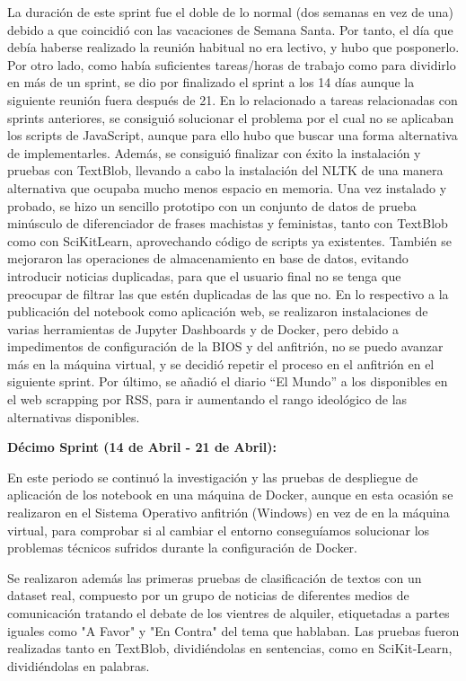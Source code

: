 La duración de este sprint fue el doble de lo normal (dos semanas en vez de una) debido a que coincidió con las vacaciones de Semana Santa. Por tanto, el día que debía haberse realizado la reunión habitual no era lectivo, y hubo que posponerlo. 
Por otro lado, como había suficientes tareas/horas de trabajo como para dividirlo en más de un sprint, se dio por finalizado el sprint a los 14 días aunque la siguiente reunión fuera después de 21.
En lo relacionado a tareas relacionadas con sprints anteriores, se consiguió solucionar el problema por el cual no se aplicaban los scripts de JavaScript, aunque para ello hubo que buscar una forma alternativa de implementarles.
Además, se consiguió finalizar con éxito la instalación y pruebas con TextBlob, llevando a cabo la instalación del NLTK de una manera alternativa que ocupaba mucho menos espacio en memoria. Una vez instalado y probado, se hizo un sencillo prototipo con un conjunto de datos de prueba minúsculo de diferenciador de frases machistas y feministas, tanto con TextBlob como con SciKitLearn, aprovechando código de scripts ya existentes.
También se mejoraron las operaciones de almacenamiento en base de datos, evitando introducir noticias duplicadas, para que el usuario final no se tenga que preocupar de filtrar las que estén duplicadas de las que no.
En lo respectivo a la publicación del notebook como aplicación web, se realizaron instalaciones de varias herramientas de Jupyter Dashboards y de Docker, pero debido a impedimentos de configuración de la BIOS y del anfitrión, no se puedo avanzar más en la máquina virtual, y se decidió repetir el proceso en el anfitrión en el siguiente sprint.
Por último, se añadió el diario “El Mundo” a los disponibles en el web scrapping por RSS, para ir aumentando el rango ideológico de las alternativas disponibles.



\textbf{Décimo Sprint (14 de Abril - 21 de Abril):}

En este periodo se continuó la investigación y las pruebas de despliegue de aplicación de los notebook en una máquina de Docker, aunque en esta ocasión se realizaron en el Sistema Operativo anfitrión (Windows) en vez de en la máquina virtual, para comprobar si al cambiar el entorno conseguíamos solucionar los problemas técnicos sufridos durante la configuración de Docker.

Se realizaron además las primeras pruebas de clasificación de textos con un dataset real, compuesto por un grupo de noticias de diferentes medios de comunicación tratando el debate de los vientres de alquiler, etiquetadas a partes iguales como "A Favor" y "En Contra" del tema que hablaban. Las pruebas fueron realizadas tanto en TextBlob, dividiéndolas en sentencias, como en SciKit-Learn, dividiéndolas en palabras.


